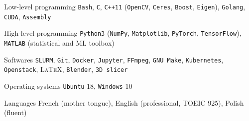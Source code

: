 


\begin{cvskills}


\cvskill
{Low-level programming} %
{\texttt{Bash}, \texttt{C}, \texttt{C++11} (\texttt{OpenCV}, \texttt{Ceres}, \texttt{Boost}, \texttt{Eigen}), \texttt{Golang}, \texttt{CUDA}, \texttt{Assembly}} %


\cvskill
{High-level programming} %
{\texttt{Python3} (\texttt{NumPy}, \texttt{Matplotlib}, \texttt{PyTorch}, \texttt{TensorFlow}), \texttt{MATLAB} (statistical and ML toolbox)} %


\cvskill
{Softwares} %
{\texttt{SLURM}, \texttt{Git}, \texttt{Docker}, \texttt{Jupyter},  \texttt{FFmpeg}, \texttt{GNU Make}, \texttt{Kubernetes}, \texttt{Openstack}, \textsc{\LaTeX}, \texttt{Blender}, \texttt{3D slicer}} %


\cvskill
{Operating systems} %
{\texttt{Ubuntu} 18, \texttt{Windows} 10} %


\cvskill
{Languages} %
{French (mother tongue), English (professional, TOEIC 925), Polish (fluent)} %


\end{cvskills}
